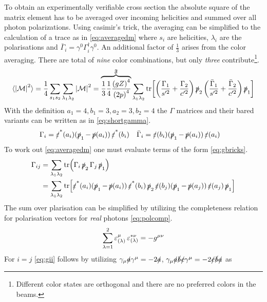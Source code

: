 %
To obtain an experimentally verifiable cross section the absolute
square of the matrix element has to be averaged over incoming
helicities and summed over all photon polarizations. Using casimir's
trick, the averaging can be simplified to the calculation of a trace
as in \cref{eq:averagedm} where \(s_i\) are helicities, \(\lambda_i\)
are the polarisations and
\(\bar{\Gamma}_i=\gamma^0\Gamma^\dagger_i\gamma^0\). An additional
factor of \(\frac{1}{3}\) arises from the color averaging. There are
total of \emph{nine} color combinations, but only \emph{three}
contribute\footnote{Different color states are orthogonal and there
  are no preferred colors in the beams.}.
%
\begin{equation}
  \label{eq:averagedm}
  \langle\abs{\mathcal{M}}^2\rangle = \frac{1}{4}\sum_{s_1 s_2}\sum_{\lambda_1
    \lambda_2} \abs{\mathcal{M}}^2=\overbrace{\frac{1}{3}\frac{1}{4}\frac{\qty(gZ)^4}{\qty(2p)^4}}^\mathfrak{F}\sum_{\lambda_1
    \lambda_2}\tr[\qty(\frac{\Gamma_1}{s'^2}+\frac{\Gamma_2}{c'^2})
  \ps_2\qty(\frac{\bar{\Gamma}_1}{s'^2}+\frac{\bar{\Gamma}_2}{c'^2})\ps_1]
\end{equation}
%
With the definition \(a_1=4,b_1=3,a_2=3,b_2=4\) the \(\Gamma\)
matrices and their bared variants can be written as in \cref{eq:shortgamma}.
%
\begin{align}
  \label{eq:shortgamma}
  \Gamma_i &= \pses(a_i)(\ps_1 - \ps(a_i))\pses(b_i) & \bar{\Gamma}_i &= \pes(b_i)(\ps_1 - \ps(a_i))\pes(a_i)
\end{align}
%
To work out \cref{eq:averagedm} one must evaluate terms of the
form \cref{eq:gbricks}.
%
\begin{equation}
  \label{eq:gbricks}
  \begin{split}
    \Gamma_{ij} &= \sum_{\lambda_1\lambda_2}
    \tr(\Gamma_i\ps_2\Gamma_j\ps_1)\\
    &= \sum_{\lambda_1\lambda_2}
    \tr[\pses(a_i)(\ps_1-\ps(a_i))\pses(b_i)\ps_2\pes(b_j)(\ps_1 -
    \ps(a_j))\pes(a_j)\ps_1]
  \end{split}
\end{equation}
%
The sum over plarisation can be simplified by utilizing the
completeness relation for polarisation vectors for \emph{real} photons
\cref{eq:polcomp}.
%
\begin{equation}
  \label{eq:polcomp}
  \sum_{\lambda=1}^{2}\pe_{(\lambda)}^\mu\pe_{(\lambda)}^{*\nu} = -g^{\mu\nu}
\end{equation}
%
For \(i=j\) \cref{eq:gii} follows by utilizing
\(\gamma_\mu\sl{a}\gamma^\mu=-2\sl{a}\),
\(\gamma_\mu\sl{a}\sl{b}\sl{c}\gamma^\mu=-2\sl{c}\sl{b}\sl{a}\) as

